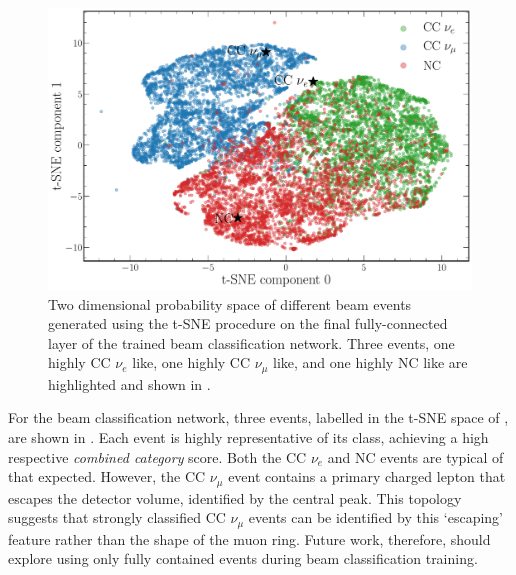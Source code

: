 \begin{figure} %
    \includegraphics[width=\textwidth]{diagrams/7-results/explain_beam_tsne.pdf}
    \caption[Beam classification network output t-SNE space]
    {Two dimensional probability space of different beam events generated using the t-SNE
        procedure on the final fully-connected layer of the trained beam classification network.
        Three events, one highly CC $\nu_{e}$ like, one highly CC $\nu_{\mu}$ like, and one highly
        NC like are highlighted and shown in .}
    \label{fig:explain_beam_tsne}
\end{figure}

For the beam classification network, three events, labelled in the t-SNE space of
, are shown in . Each
event is highly representative of its class, achieving a high respective \emph{combined category}
score. Both the CC $\nu_{e}$ and NC events are typical of that expected. However, the CC
$\nu_{\mu}$ event contains a primary charged lepton that escapes the detector volume, identified
by the central peak. This topology suggests that strongly classified CC $\nu_{\mu}$ events can be
identified by this `escaping' feature rather than the shape of the muon ring. Future work,
therefore, should explore using only fully contained events during beam classification training.

